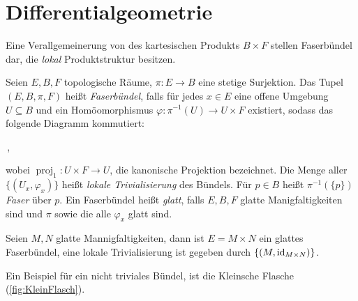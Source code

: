 \section{Differentialgeometrie}
Eine Verallgemeinerung von des kartesischen Produkts $B\times F$ stellen
Faserbündel dar, die \emph{lokal} Produktstruktur besitzen. 
\begin{definition}[Faserbündel]
Seien $E,B,F$ topologische Räume, $\pi:E\to B$ eine stetige Surjektion.
Das Tupel $(E,B,\pi,F)$ heißt \emph{Faserbündel},
falls für jedes $x\in E$ eine offene Umgebung $U\subseteq B$ und ein
Homöomorphismus $\varphi:\pi^{-1}(U)\to U\times F$ existiert, sodass das folgende Diagramm kommutiert:
\begin{center}
\,,
\end{center}
wobei $\operatorname{proj}_1:U\times F \to U$, die kanonische Projektion
bezeichnet. Die Menge aller $\{(U_x,\varphi_x)\}$ heißt \emph{lokale
Trivialisierung} des Bündels. Für $p\in B$ heißt $\pi^{-1}(\{p\})$
\emph{Faser} über $p$.  
Ein Faserbündel heißt \emph{glatt},
falls $E,B,F$ glatte Manigfaltigkeiten sind und $\pi$ sowie die alle $\varphi_x$
glatt sind.
\end{definition}
\begin{beispiel}
Seien $M,N$ glatte Mannigfaltigkeiten, dann ist $E=M\times N$ ein glattes
Faserbündel, eine lokale Trivialisierung
ist gegeben durch $\{(M,\operatorname{id}_{M\times N})\}$.
\end{beispiel}
Ein Beispiel für ein nicht triviales Bündel, ist die Kleinsche Flasche
(\autoref{fig:KleinFlasch}). 
